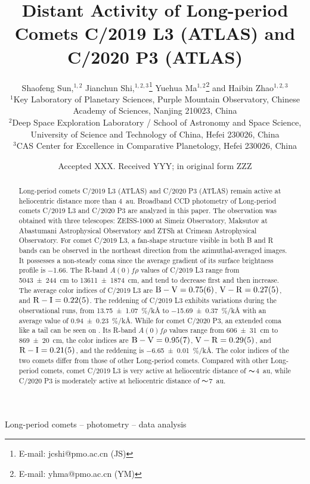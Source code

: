 \documentclass[fleqn,usenatbib]{mnras}
\title[Distant Activity of C/2019 L3 and C/2020 P3]{Distant Activity of Long-period Comets C/2019 L3 (ATLAS) and C/2020 P3 (ATLAS)}
\author[Shaofeng Sun et al.]{
Shaofeng Sun,$^{1,2}$
Jianchun Shi,$^{1,2,3}$\thanks{E-mail: jcshi@pmo.ac.cn (JS)}
Yuehua Ma$^{1,2}$\thanks{E-mail: yhma@pmo.ac.cn (YM)}
and Haibin Zhao$^{1,2,3}$
\\
$^{1}$Key Laboratory of Planetary Sciences, Purple Mountain Observatory, Chinese Academy of Sciences, Nanjing 210023, China\\
$^{2}$Deep Space Exploration Laboratory / School of Astronomy and Space Science, University of Science and Technology of China, Hefei 230026, China\\
$^{3}$CAS Center for Excellence in Comparative Planetology, Hefei 230026, China
}
\date{Accepted XXX. Received YYY; in original form ZZZ}
\begin{document}
\label{firstpage}
\pagerange{\pageref{firstpage}--\pageref{lastpage}}
\maketitle


\begin{abstract}
	Long-period comets C/2019 L3 (ATLAS) and C/2020 P3 (ATLAS) remain active at heliocentric distance more than {\qty{4}{\astronomicalunit}}. Broadband CCD photometry of Long-period comets C/2019 L3 and C/2020 P3 are analyzed in this paper.
	The observation was obtained with three telescopes: ZEISS-1000 at Simeiz Observatory, Maksutov at Abastumani Astrophysical Observatory and ZTSh at Crimean Astrophysical Observatory. For comet C/2019 L3, a fan-shape structure visible in both B and R bands can be observed in the northeast direction from the azimuthal-averaged images. It possesses a non-steady coma since the average gradient of its surface brightness profile is \num{-1.66}. The R-band $A(0)f\rho$ values of C/2019 L3 range from {\SI{5043 +- 244}{\cm}} to {\SI{13611 +- 1874}{\cm}}, and tend to decrease first and then increase. The average color indices of C/2019 L3 are $\mathrm{B-V} = \num{0.75 +- 0.06}$, $\mathrm{V-R} = \num{0.27 +- 0.05}$, and $\mathrm{R-I} = \num{0.22 +- 0.05}$. The reddening of C/2019 L3 exhibits variations during the observational runs, from {\SI{13.75 +- 1.07}{\percent/\kilo\angstrom}} to {\SI{-15.69 +- 0.37}{\percent/\kilo\angstrom}} with an average value of {\SI{0.94 +- 0.23}{\percent/\kilo\angstrom}}. While for comet C/2020 P3, an extended coma like a tail can be seen on . Its R-band $A(0)f\rho$ values range from {\SI{606 +- 31}{\cm}} to {\SI{869 +- 20}{\cm}}, the color indices are $\mathrm{B-V} = \num{0.95 +- 0.07}$, $\mathrm{V-R} = \num{0.29 +- 0.05}$, and $\mathrm{R-I} = \num{0.21 +- 0.05}$, and the reddening is {\SI{-6.65 +- 0.01}{\percent/\kilo\angstrom}}. The color indices of the two comets differ from those of other Long-period comets. Compared with other Long-period comets, comet C/2019 L3 is very active at heliocentric distance of $\thicksim${\qty{4}{\astronomicalunit}}, while C/2020 P3 is moderately active at heliocentric distance of $\thicksim${\qty{7}{\astronomicalunit}}. 
\end{abstract}

\begin{keywords}
Long-period comets -- photometry -- data analysis
\end{keywords}
\end{document}
